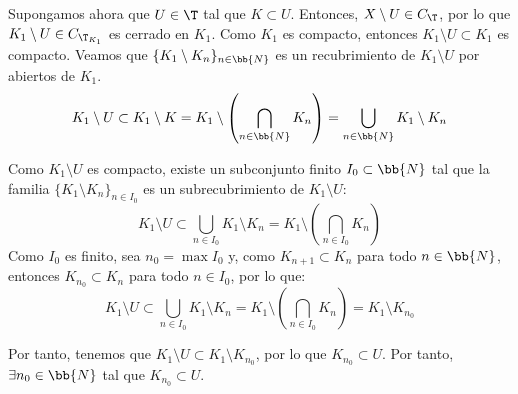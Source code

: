 \begin{ejercicio}
\begin{comment}
    Por tanto, como $K_1\neq \emptyset$, tenemos que $K_{n_0}=\emptyset$, lo que es una contradicción, ya que $K_{n_0}$ es no vacío.
    Por tanto, $K\neq \emptyset$.

    \begin{observacion}
        Al empezar a hacer el ejercicio, se podría pensar que está demostrada esta primera parte en el Ejercicio \ref{ej:4.3.19}, pero no es así.
        En el Ejercicio \ref{ej:4.3.19} se pide que $(X,\T)$ sea compacto, mientras que en este ejercicio se pide que sea Hausdorff, entre otros cambios.
        Sí es cierto que la demostración es similar, aunque el papel de $X$ como compacto en dicho ejercicio es
        sustituido por el papel de $K_1$ como compacto en este ejercicio.
    \end{observacion}
    \end{comment}

    Supongamos ahora que $U\in \T$ tal que $K\subset U$. Entonces, $X \setminus U\in C_\T$, por lo que $K_1\setminus U\in C_{\T_{K_1}}$ es cerrado en $K_1$.
    Como $K_1$ es compacto, entonces $K_1\setminus U\subset K_1$ es compacto. Veamos que $\{K_1\setminus K_n\}_{n\in \bb{N}}$ es un recubrimiento de $K_1\setminus U$ por abiertos de $K_1$.
    \begin{equation*}
        K_1\setminus U \subset K_1\setminus K
        = K_1 \setminus \left(\bigcap_{n\in \bb{N}} K_n\right)
        = \bigcup_{n\in \bb{N}} K_1\setminus K_n
    \end{equation*}

    Como $K_1\setminus U$ es compacto, existe un subconjunto finito $I_0\subset \bb{N}$ tal que la familia $\{K_1\setminus K_n\}_{n\in I_0}$ es un subrecubrimiento de $K_1\setminus U$:
    \begin{equation*}
        K_1\setminus U \subset \bigcup_{n\in I_0} K_1\setminus K_n
        = K_1\setminus \left(\bigcap_{n\in I_0} K_n\right)
    \end{equation*}
    Como $I_0$ es finito, sea $n_0=\max I_0$ y, como $K_{n+1}\subset K_n$ para todo $n\in \bb{N}$, entonces
    $K_{n_0} \subset K_n$ para todo $n\in I_0$, por lo que:
    \begin{equation*}
        K_1\setminus U \subset \bigcup_{n\in I_0} K_1\setminus K_n
        = K_1\setminus \left(\bigcap_{n\in I_0} K_n\right)
        = K_1\setminus K_{n_0}
    \end{equation*}

    Por tanto, tenemos que $K_1\setminus U \subset K_1\setminus K_{n_0}$, por lo que $K_{n_0}\subset U$. Por tanto, $\exists n_0\in \bb{N}$ tal que $K_{n_0}\subset U$.


\end{ejercicio}


